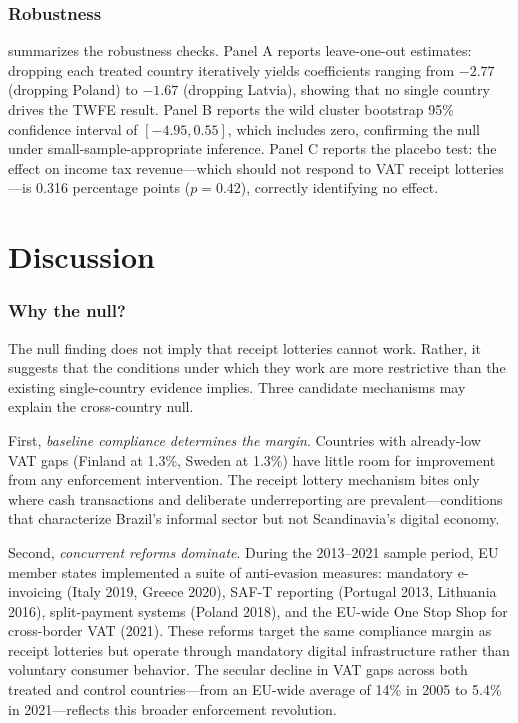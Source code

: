 \documentclass[12pt]{article}
\begin{document}


\subsubsection*{Robustness}  summarizes the robustness checks. Panel A reports leave-one-out estimates: dropping each treated country iteratively yields coefficients ranging from $-2.77$ (dropping Poland) to $-1.67$ (dropping Latvia), showing that no single country drives the TWFE result. Panel B reports the wild cluster bootstrap 95\% confidence interval of $[-4.95, 0.55]$, which includes zero, confirming the null under small-sample-appropriate inference. Panel C reports the placebo test: the effect on income tax revenue---which should not respond to VAT receipt lotteries---is 0.316 percentage points ($p = 0.42$), correctly identifying no effect.



\section{Discussion}
\label{sec:discussion}

\subsubsection*{Why the null?} The null finding does not imply that receipt lotteries cannot work. Rather, it suggests that the conditions under which they work are more restrictive than the existing single-country evidence implies. Three candidate mechanisms may explain the cross-country null.

First, \textit{baseline compliance determines the margin}. Countries with already-low VAT gaps (Finland at 1.3\%, Sweden at 1.3\%) have little room for improvement from any enforcement intervention. The receipt lottery mechanism bites only where cash transactions and deliberate underreporting are prevalent---conditions that characterize Brazil's informal sector but not Scandinavia's digital economy.

Second, \textit{concurrent reforms dominate}. During the 2013--2021 sample period, EU member states implemented a suite of anti-evasion measures: mandatory e-invoicing (Italy 2019, Greece 2020), SAF-T reporting (Portugal 2013, Lithuania 2016), split-payment systems (Poland 2018), and the EU-wide One Stop Shop for cross-border VAT (2021). These reforms target the same compliance margin as receipt lotteries but operate through mandatory digital infrastructure rather than voluntary consumer behavior. The secular decline in VAT gaps across both treated and control countries---from an EU-wide average of 14\% in 2005 to 5.4\% in 2021---reflects this broader enforcement revolution.
\end{document}
